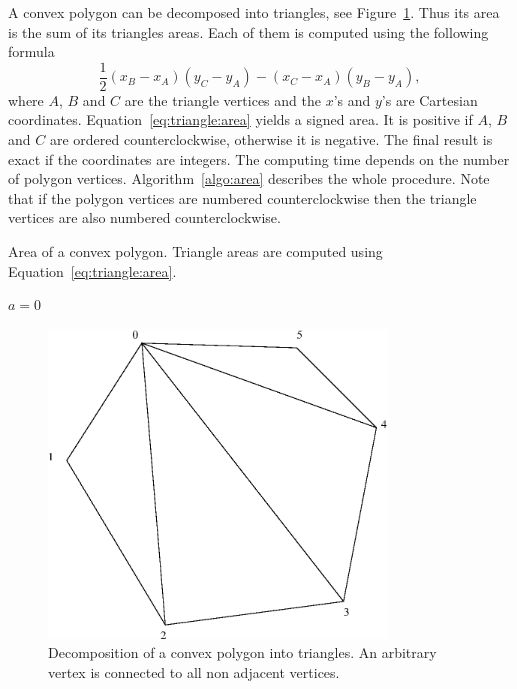A convex polygon can be decomposed into triangles, see
Figure~\ref{figairepoly}. Thus its area is
the sum of its triangles areas. Each of them is computed using the
following formula
\begin{equation}
  \label{eq:triangle:area}
  \frac{1}{2}(x_B - x_A)(y_C - y_A) - (x_C - x_A)(y_B - y_A),
\end{equation}
where $A$, $B$ and $C$ are the triangle vertices and the $x$'s and
$y$'s are Cartesian coordinates. Equation~\eqref{eq:triangle:area}
yields a signed area. It is positive if $A$, $B$ and $C$ are ordered
counterclockwise, otherwise it is negative. The final result is exact
if the coordinates are integers.  The computing time depends on the
number of polygon vertices. Algorithm~\ref{algo:area} describes the
whole procedure. Note that if the polygon vertices are numbered
counterclockwise then the triangle vertices are also numbered
counterclockwise.
\begin{algorithm}[tbph]
  \caption{Area of a convex polygon. Triangle areas are computed
    using Equation~\eqref{eq:triangle:area}.}
  \label{algo:area}
  $a=0$\;
\end{algorithm}
\begin{figure}[tbph]
  \begin{center}
    \includegraphics[width=9cm]{./VignetteDir/graphics/airepoly.eps}
    \caption{Decomposition of a convex polygon into triangles. An
      arbitrary vertex is connected to all non adjacent vertices.}
    \label{figairepoly}
  \end{center}
\end{figure}

